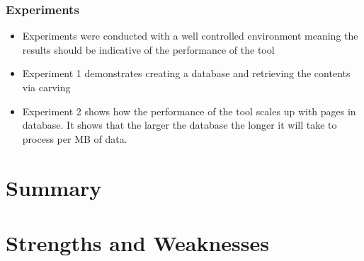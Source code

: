 \documentclass[11pt,]{article}
\providecommand{\tightlist}{%
  \setlength{\itemsep}{0pt}\setlength{\parskip}{0pt}}
\begin{document}
\hypertarget{experiments}{%
\subsubsection{Experiments}\label{experiments}}

\begin{itemize}
\tightlist
\item
  Experiments were conducted with a well controlled environment meaning
  the results should be indicative of the performance of the tool
\item
  Experiment 1 demonstrates creating a database and retrieving the
  contents via carving
\item
  Experiment 2 shows how the performance of the tool scales up with
  pages in database. It shows that the larger the database the longer it
  will take to process per MB of data.
\end{itemize}

\hypertarget{summary}{%
\section{Summary}\label{summary}}

\hypertarget{strengths-and-weaknesses}{%
\section{Strengths and Weaknesses}\label{strengths-and-weaknesses}}
\end{document}
